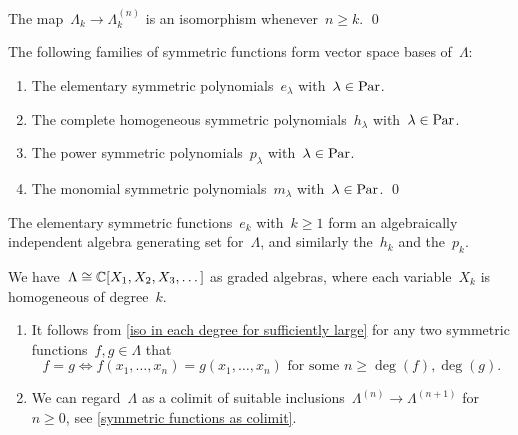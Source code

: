 \documentclass[a4paper,11pt]{scrartcl}
\begin{document}
\begin{corollary}
  \label{iso in each degree for sufficiently large}
  The map~$\Lambda_k \to \Lambda^{(n)}_k$ is an isomorphism whenever~$n \geq k$.
  \qed
\end{corollary}

\begin{corollary}
  The following families of symmetric functions form vector space bases of~$\Lambda$:
  \begin{enumerate}
    \item
      The elementary symmetric polynomials~$e_\lambda$ with~$\lambda \in \mathrm{Par}$.
    \item
      The complete homogeneous symmetric polynomials~$h_\lambda$ with~$\lambda \in \mathrm{Par}$.
    \item
      The power symmetric polynomials~$p_\lambda$ with~$\lambda \in \mathrm{Par}$.
    \item
      The monomial symmetric polynomials~$m_\lambda$ with~$\lambda \in \mathrm{Par}$.
    \qed
  \end{enumerate}
\end{corollary}

\begin{corollary}
  The elementary symmetric functions~$e_k$ with~$k \geq 1$ form an algebraically independent algebra generating set for~$\Lambda$, and similarly the~$h_k$ and the~$p_k$.
\end{corollary}

\begin{corollary}
  We have~$\Lambda \cong \mathbb{C}[X_1, X_2, X_3, \dotsc]$ as graded algebras, where each variable~$X_k$ is homogeneous of degree~$k$.
\end{corollary}

\begin{remark}
  \leavevmode
  \begin{enumerate}
    \item
      It follows from \cref{iso in each degree for sufficiently large} for any two symmetric functions~$f, g \in \Lambda$ that
      \[
        f = g
        \iff
        \text{$f(x_1, \dotsc, x_n) = g(x_1, \dotsc, x_n)$ for some~$n \geq \deg(f), \deg(g)$.}
      \]
    \item
      We can regard~$\Lambda$ as a colimit of suitable inclusions~$\Lambda^{(n)} \to \Lambda^{(n+1)}$ for~$n \geq 0$, see \cref{symmetric functions as colimit}.
  \end{enumerate}
\end{remark}
\end{document}
